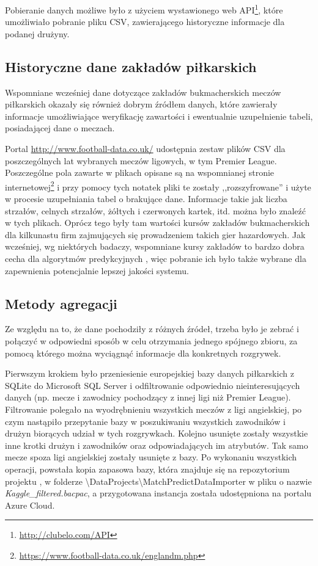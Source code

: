         Pobieranie danych możliwe było z użyciem wystawionego web API\footnote{\url{http://clubelo.com/API}}, które umożliwiało pobranie pliku CSV, zawierającego historyczne informacje dla podanej drużyny.
        
        \subsection{Historyczne dane zakładów piłkarskich} \label{subsec:football-data}
         \noindent Wspomniane wcześniej dane dotyczące zakładów bukmacherskich meczów piłkarskich okazały się również dobrym źródłem danych, które zawierały informacje umożliwiające weryfikację zawartości i ewentualnie uzupełnienie tabeli, posiadającej dane o meczach. 
         
         \noindent Portal \url{http://www.football-data.co.uk/} udostępnia zestaw plików CSV dla poszczególnych lat wybranych meczów ligowych, w tym Premier League. Poszczególne pola zawarte w plikach opisane są na wspomnianej stronie internetowej\footnote{\url{https://www.football-data.co.uk/englandm.php}} i przy pomocy tych notatek pliki te zostały ,,rozszyfrowane'' i użyte w procesie uzupełniania tabel o brakujące dane. Informacje takie jak liczba strzałów, celnych strzałów, żółtych i czerwonych kartek, itd. można było znaleźć w tych plikach. Oprócz tego były tam wartości kursów zakładów bukmacherskich dla kilkunastu firm zajmujących się prowadzeniem takich gier hazardowych. Jak wcześniej, wg niektórych badaczy, wspomniane kursy zakładów to bardzo dobra cecha dla algorytmów predykcyjnych \cite{EloRating-1}, więc pobranie ich było także wybrane dla zapewnienia potencjalnie lepszej jakości systemu.
        
        \subsection{Metody agregacji}
        \noindent Ze względu na to, że dane pochodziły z różnych źródeł, trzeba było je zebrać i połączyć w odpowiedni sposób w celu otrzymania jednego spójnego zbioru, za pomocą którego można wyciągnąć informacje dla konkretnych rozgrywek. 
        
        Pierwszym krokiem było przeniesienie europejskiej bazy danych piłkarskich z SQLite do Microsoft SQL Server i odfiltrowanie odpowiednio nieinteresujących danych (np. mecze i zawodnicy pochodzący z innej ligi niż Premier League). Filtrowanie polegało na wyodrębnieniu wszystkich meczów z ligi angielskiej, po czym nastąpiło przepytanie bazy w poszukiwaniu wszystkich zawodników i drużyn biorących udział w tych rozgrywkach. Kolejno usunięte zostały wszystkie inne krotki drużyn i zawodników oraz odpowiadających im atrybutów. Tak samo mecze spoza ligi angielskiej zostały usunięte z bazy. Po wykonaniu wszystkich operacji, powstała kopia zapasowa bazy, która znajduje się na repozytorium projektu \cite{repo}, w folderze \textbackslash DataProjects\textbackslash MatchPredictDataImporter w pliku o nazwie \textit{Kaggle\_filtered.bacpac}, a przygotowana instancja została udostępniona na portalu Azure Cloud.
        
